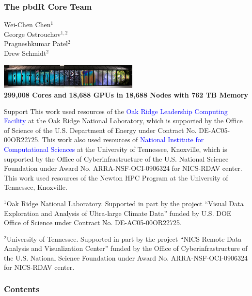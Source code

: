 \frame{
  \maketitle
}

\setcounter{footnote}{0}
\begin{frame}[noframenumbering]
\frametitle{The pbdR Core Team}
\begin{minipage}{3.6cm}
Wei-Chen Chen$^1$ \\
George Ostrouchov$^{1,2}$ \\
Pragneshkumar Patel$^2$ \\
Drew Schmidt$^2$ \\[2ex]
\end{minipage}
\begin{minipage}{7cm}
  \includegraphics[width=7cm]{../common/pics/titan1wide} \\
  \tiny\bf 299,008 Cores and 18,688 GPUs in 18,688 Nodes with
  762 TB Memory \\
\end{minipage}

\vspace{-1.5em}
\begin{block}{Support}\tiny
  This work used resources of the \textcolor{blue}{Oak Ridge
    Leadership Computing Facility} at the Oak Ridge National
  Laboratory, which is supported by the Office of Science of the
  U.S. Department of Energy under Contract No. DE-AC05-00OR22725. This
  work also used resources of \textcolor{blue}{National Institute for
    Computational Sciences} at the University of Tennessee, Knoxville,
  which is supported by the Office of Cyberinfrastructure of the
  U.S. National Science Foundation under Award
  No. ARRA-NSF-OCI-0906324 for NICS-RDAV center. This work used
  resources of the Newton HPC Program at the University of Tennessee,
  Knoxville.

  \tiny \vspace{1em}$^1$Oak Ridge National Laboratory. Supported in
  part by the project ``Visual Data Exploration and Analysis of
  Ultra-large Climate Data'' funded by U.S. DOE Office of Science
  under Contract No. DE-AC05-00OR22725.

  \vspace{1em}$^2$University of Tennessee. Supported in part by the
  project ``NICS Remote Data Analysis and Visualization Center''
  funded by the Office of Cyberinfrastructure of the U.S. National
  Science Foundation under Award No. ARRA-NSF-OCI-0906324 for
  NICS-RDAV center.
\end{block}
\end{frame}

\begin{frame}
\frametitle{Contents}
\small
\tableofcontents[hideallsubsections]
\end{frame}

\setcounter{framenumber}{0}
